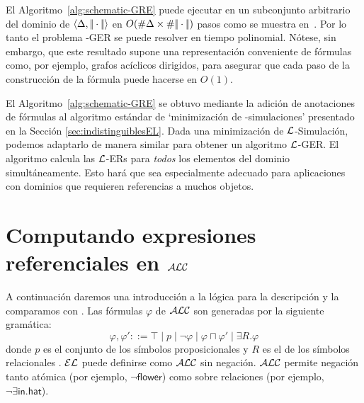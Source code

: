 


El Algoritmo~\ref{alg:schematic-GRE} puede ejecutar en un subconjunto arbitrario del dominio de $\langle \Delta,|\!|\cdot|\!| \rangle$
 en $O(\# \Delta\times\# |\!|\cdot|\!|)$ pasos como se muestra en~\cite{HHK95}. Por lo tanto el problema \EL-GER se puede resolver en tiempo polinomial. N\'otese, sin embargo, que este resultado supone una representaci\'on conveniente de
f\'ormulas como, por ejemplo, grafos ac\'iclicos dirigidos, para asegurar que
cada paso de la construcci\'on de la f\'ormula puede hacerse en $O(1)$. %

El Algoritmo~\ref{alg:schematic-GRE} se obtuvo mediante la adici\'on de anotaciones de f\'ormulas
al algoritmo est\'andar de `minimizaci\'on de \EL-simulaciones' presentado en la Secci\'on \ref{sec:indistinguiblesEL}. Dada una minimizaci\'on de
$\mathcal{L}$-Simulaci\'on, podemos adaptarlo de
manera similar para obtener un algoritmo $\mathcal{L}$-GER.
El algoritmo calcula las $\mathcal{L}$-ERs para \emph{todos} los elementos del
dominio simult\'aneamente.
Esto har\'a que sea especialmente adecuado para aplicaciones con
dominios que requieren referencias a muchos objetos.

\section{Computando expresiones referenciales en $\mathcal{ALC}$}
\label{sec:bisimulacion}

%

A continuaci\'on daremos una introducci\'on a la l\'ogica para la descripci\'on \alc y la comparamos con \el. Las f\'ormulas $\varphi$ de $\mathcal{ALC}$ son generadas por la siguiente gram\'atica:
$$
\varphi,\varphi' ::= \top \mid p \mid \neg \varphi \mid \varphi \sqcap \varphi'
\mid \exists R. \varphi
$$
donde $p$ es el conjunto de los s\'imbolos proposicionales \prop y $R$ es el de los s\'imbolos relacionales \rel. $\mathcal{EL}$ puede definirse como $\mathcal{ALC}$ sin negaci\'on. $\mathcal{ALC}$ permite negaci\'on tanto at\'omica (por ejemplo, $\neg \mathsf{flower}$) como sobre relaciones (por ejemplo, $\neg \exists \mathsf{in}.\mathsf{hat}$).

